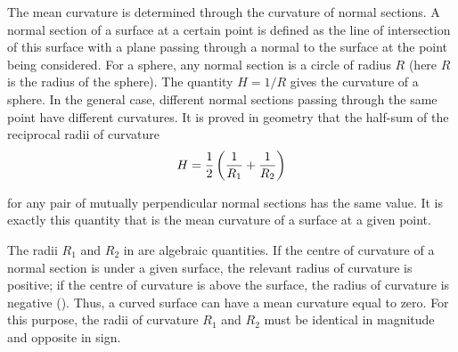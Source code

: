 The mean curvature is determined through the curvature of normal sections. A normal section of a surface at a certain point is defined as the line of intersection of this surface with a plane passing through a normal to the surface at the point being considered. For a sphere, any normal section is a circle of radius $R$ (here $R$ is the radius of the sphere). The quantity $H=1/R$ gives the curvature of a sphere. In the general case, different normal sections passing through the same point have different curvatures. It is proved in geometry that the half-sum of the reciprocal radii of curvature
\begin{equation}\label{eq:14_2}
	H = \frac{1}{2}\left(\frac{1}{R_1} + \frac{1}{R_2}\right)
\end{equation}

\noindent
for any pair of mutually perpendicular normal sections has the same value. It is exactly this quantity that is the mean curvature of a surface at a given point.

The radii $R_1$ and $R_2$ in  are algebraic quantities. If the centre of curvature of a normal section is under a given surface, the relevant radius of curvature is positive; if the centre of curvature is above the surface, the radius of curvature is negative (). Thus, a curved surface can have a mean curvature equal to zero. For this purpose, the radii of curvature $R_1$ and $R_2$ must be identical in magnitude and opposite in sign.


